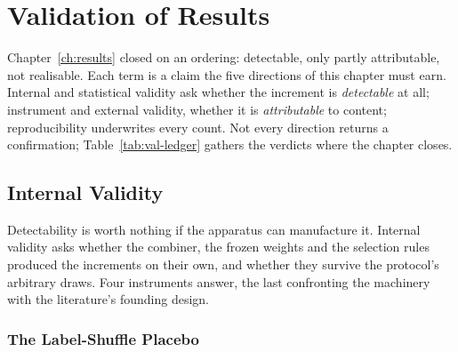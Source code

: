 \chapter{Validation of Results}
\label{ch:validation}


Chapter~\ref{ch:results} closed on an ordering: detectable, only partly attributable, not realisable. Each term is a claim the five directions of this chapter must earn. Internal and statistical validity ask whether the increment is \emph{detectable} at all; instrument and external validity, whether it is \emph{attributable} to content; reproducibility underwrites every count. Not every direction returns a confirmation; Table~\ref{tab:val-ledger} gathers the verdicts where the chapter closes.

\section{Internal Validity}
\label{sec:val-internal}

Detectability is worth nothing if the apparatus can manufacture it. Internal validity asks whether the combiner, the frozen weights and the selection rules produced the increments on their own, and whether they survive the protocol's arbitrary draws. Four instruments answer, the last confronting the machinery with the literature's founding design.

\subsection{The Label-Shuffle Placebo}
\label{sec:val-placebo}

